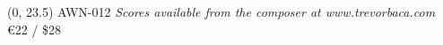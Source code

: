 \documentclass[10pt]{article}
\begin{document}
\begin{textblock}{23}(0, 23.5)
AWN-012 \hfill
\textit{Scores available from the composer at www.trevorbaca.com} \hfill
\euro 22 / \$28
\end{textblock}
\end{document}
